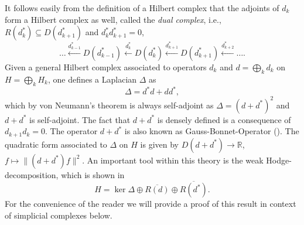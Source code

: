 \documentclass[10pt]{amsart}
\theoremstyle{definition}
\begin{document}
It follows easily from the definition of a Hilbert complex that the adjoints of $d_k$ form a Hilbert complex as well, called the \textit{dual complex}, i.e., $R(d_{k}^{*})\subseteq D(d_{k+1}^{*})$ and $d_{k}^{*}d_{k+1}^{*}=0$,
$$\ldots\xleftarrow{d^*_{k-1}} D(d^*_{k-1})\xleftarrow{d^*_{k}}D(d^*_k)\xleftarrow{d^*_{k+1}}D(d^*_{k+1})\xleftarrow{d^*_{k+2}}\ldots.$$
Given a general Hilbert complex associated to operators $d_k$ and $d = \bigoplus_kd_k$ on $H=\bigoplus_{k}H_{k}$, one defines a Laplacian $\Delta$ as $$\Delta = d^*d+dd^*,$$ which by von Neumann's theorem \cite[Theorem~5.39]{W} is always self-adjoint as $\Delta = (d+d^*)^2$ and $d+d^*$ is self-adjoint. The fact that $d+d^*$ is densely defined is a consequence of $d_{k+1}d_k = 0.$ The operator $d+d^*$ is also known as Gauss-Bonnet-Operator (\cite{ATH,parra2017spectral}). The quadratic form associated to $\Delta$ on $H$ is given by $D(d+d^{*})\to \mathbb{R}$, $f\mapsto \|(d+d^{*})f\|^{2}$. An important tool within this theory is the weak Hodge-decomposition, which is shown in
  \cite[Lemma~2.1. and Lemma~2.2.]{BL}
$$H = \ker\Delta \oplus\overline{R(d)}\oplus\overline{R(d^{*})}.$$ For the convenience of the reader we will provide a proof of this result in context of simplicial complexes below.
\end{document}
